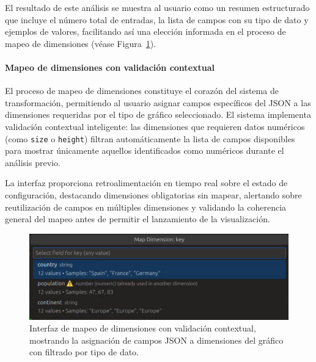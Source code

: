 \documentclass[a4paper, 12pt]{book}
\begin{document}
El resultado de este análisis se muestra al usuario como un resumen estructurado que incluye el número total de entradas, la lista de campos con su tipo de dato y ejemplos de valores, facilitando así una elección informada en el proceso de mapeo de dimensiones (véase Figura~\ref{fig:ui-dimension-mapping-process}).

\paragraph{Mapeo de dimensiones con validación contextual}
El proceso de mapeo de dimensiones constituye el corazón del sistema de transformación, permitiendo al usuario asignar campos específicos del JSON a las dimensiones requeridas por el tipo de gráfico seleccionado. El sistema implementa validación contextual inteligente: las dimensiones que requieren datos numéricos (como \texttt{size} o \texttt{height}) filtran automáticamente la lista de campos disponibles para mostrar únicamente aquellos identificados como numéricos durante el análisis previo.

La interfaz proporciona retroalimentación en tiempo real sobre el estado de configuración, destacando dimensiones obligatorias sin mapear, alertando sobre reutilización de campos en múltiples dimensiones y validando la coherencia general del mapeo antes de permitir el lanzamiento de la visualización.

\begin{figure}[H]
\centering
\includegraphics[width=0.80\linewidth]{img/ui-dimension-mapping-process.png}
\caption{Interfaz de mapeo de dimensiones con validación contextual, mostrando la asignación de campos JSON a dimensiones del gráfico con filtrado por tipo de dato.}
\label{fig:ui-dimension-mapping-process}
\end{figure}
\end{document}
